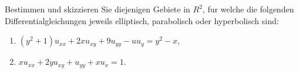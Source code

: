 
\begin{exercise}

Bestimmen und skizzieren Sie diejenigen Gebiete in $R^2$, fur welche die folgenden Differentialgleichungen jeweils elliptisch, parabolisch oder hyperbolisch sind:

\begin{enumerate}[label = (\roman*)]
    \item $(y^2 + 1) u_{xx} + 2 x u_{xy} + 9 u_{yy} - u u_y = y^2 - x$,
    \item $x u_{xx} + 2 y u_{xy} + u_{yy} + x u_x = 1$.
\end{enumerate}

\end{exercise}


